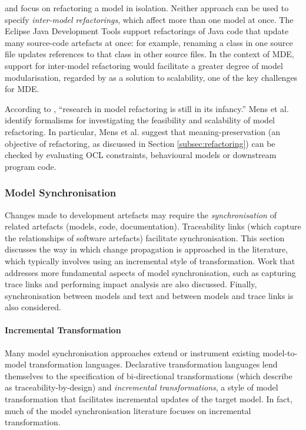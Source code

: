  
\cite{kolovos07ewl} and \cite{arendt09refactoring} focus on refactoring a model in isolation. Neither approach can be used to specify \emph{inter-model refactorings}, which affect more than one model at once. The Eclipse Java Development Tools support refactorings of Java code that update many source-code artefacts at once: for example, renaming a class in one source file updates references to that class in other source files. In the context of MDE, support for inter-model refactoring would facilitate a greater degree of model modularisation, regarded by \cite{kolovos08scalability} as a solution to scalability, one of the key challenges for MDE.

According to \cite{mens07modelrefactoring}, ``research in model refactoring is still in its infancy.'' Mens et al. identify formalisms for investigating the feasibility and scalability of model refactoring. In particular, Mens et al. suggest that meaning-preservation (an objective of refactoring, as discussed in Section \ref{subsec:refactoring}) can be checked by evaluating OCL constraints, behavioural models or downstream program code.


\subsubsection{Model Synchronisation}
\label{subsubsec:model_synch}
Changes made to development artefacts may require the \emph{synchronisation} of related artefacts (models, code, documentation). Traceability links (which capture the relationships of software artefacts) facilitate synchronisation. This section discusses the way in which change propagation is approached in the literature, which typically involves using an incremental style of transformation. Work that addresses more fundamental aspects of model synchronisation, such as capturing trace links and performing impact analysis are also discussed. Finally, synchronisation between models and text and between models and trace links is also considered.

\paragraph{Incremental Transformation}
Many model synchronisation approaches extend or instrument existing model-to-model transformation languages. Declarative transformation languages lend themselves to the specification of bi-directional transformations (which \cite{fritzsche08tracing} describe as traceability-by-design) and \emph{incremental transformations}, a style of model transformation that facilitates incremental updates of the target model. In fact, much of the model synchronisation literature focuses on incremental transformation. 

